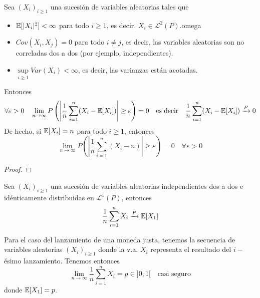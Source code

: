 \begin{teo}
    Sea $(X_i)_{i\geq 1}$ una sucesión de variables aleatorias tales que
    \begin{itemize}
        \item $\mathbb{E}[|X_i|^2] < \infty$ para todo $i\geq 1$, es decir, $X_i \in \mathcal{L}^2(P)$.omega
        \item $Cov(X_i, X_j) = 0$ para todo $i\neq j$, es decir, las variables aleatorias son no correladas dos a dos (por ejemplo, independientes).
        \item $\sup\limits_{i\geq 1} Var(X_i) < \infty$, es decir, las varianzas están acotadas.
    \end{itemize}
    Entonces
    \begin{equation*}
        \forall \varepsilon > 0 \quad \lim_{n\to \infty}P\left( \left| \dfrac{1}{n} \sum_{i=1}^n (X_i - \mathbb{E}[X_i]) \right| \geq \varepsilon \right) = 0 \quad \text{es decir} \quad \dfrac{1}{n} \sum_{i=1}^n (X_i - \mathbb{E}[X_i]) \xrightarrow{P} 0
    \end{equation*}
    De hecho, si $\mathbb{E}[X_i] = n$ para todo $i\geq 1$, entonces
    \begin{equation*}
        \lim_{n\to \infty}P\left( \left| \dfrac{1}{n} \sum_{i=1}^n (X_i - n) \right| \geq \varepsilon \right) = 0 \quad \forall \varepsilon > 0
    \end{equation*}
    \begin{proof}
    \end{proof}
\end{teo}

\begin{teo}
    Sea $(X_i)_{i\geq 1}$ una sucesión de variables aleatorias independientes dos a dos e idénticamente distribuidas en $\mathcal{L}^1(P)$, entonces
    \begin{equation*}
        \dfrac{1}{n} \sum_{i=1}^n X_i \xrightarrow{P} \mathbb{E}[X_1]
    \end{equation*}
\end{teo}

\begin{ejemplo}
    Para el caso del lanzamiento de una moneda justa, tenemos la secuencia de variables aleatorias $(X_i)_{i\geq 1}$ donde la v.a. $X_i$ representa el resultado del $i-$ésimo lanzamiento. Tenemos entonces
    \begin{equation*}
        \lim_{n\to \infty} \dfrac{1}{n} \sum_{i=1}^n X_i = p \in ]0,1[ \quad \text{casi seguro}
    \end{equation*}
    donde $\mathbb{E}[X_1] = p$.
\end{ejemplo}

